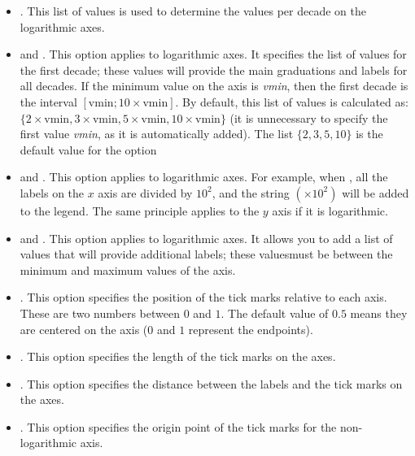 \begin{itemize}
\begin{itemize}
    \item {}. This list of values ​​is used to determine the values ​​per decade on the logarithmic axes.

    \item {} and . This option applies to logarithmic axes. It specifies the list of values ​​for the first decade; these values ​​will provide the main graduations and labels for all decades. If the minimum value on the axis is \emph{vmin}, then the first decade is the interval $[\mathrm{vmin};10\times\mathrm{vmin}]$. By default, this list of values ​​is calculated as: $\{2\times\mathrm{vmin}, 3\times\mathrm{vmin}, 5\times\mathrm{vmin}, 10\times\mathrm{vmin}\}$ (it is unnecessary to specify the first value \emph{vmin}, as it is automatically added). The list $\{2,3,5,10\}$ is the default value for the  option
    
    \item {} and . This option applies to logarithmic axes. For example, when , all the labels on the $x$ axis are divided by $10^2$, and the string $(\times10^2)$ will be added to the legend. The same principle applies to the $y$ axis if it is logarithmic.
    
    \item {} and . This option applies to logarithmic axes. It allows you to add a list of values ​​that will provide additional labels; these values ​​must be between the minimum and maximum values ​​of the axis.
    
    \item {}. This option specifies the position of the tick marks relative to each axis. These are two numbers between $0$ and $1$. The default value of $0.5$ means they are centered on the axis ($0$ and $1$ represent the endpoints).
    
    \item {}. This option specifies the length of the tick marks on the axes.
    
    \item {}. This option specifies the distance between the labels and the tick marks on the axes.
    
    \item {}. This option specifies the origin point of the tick marks for the non-logarithmic axis.
    

\end{itemize}
\end{itemize}
